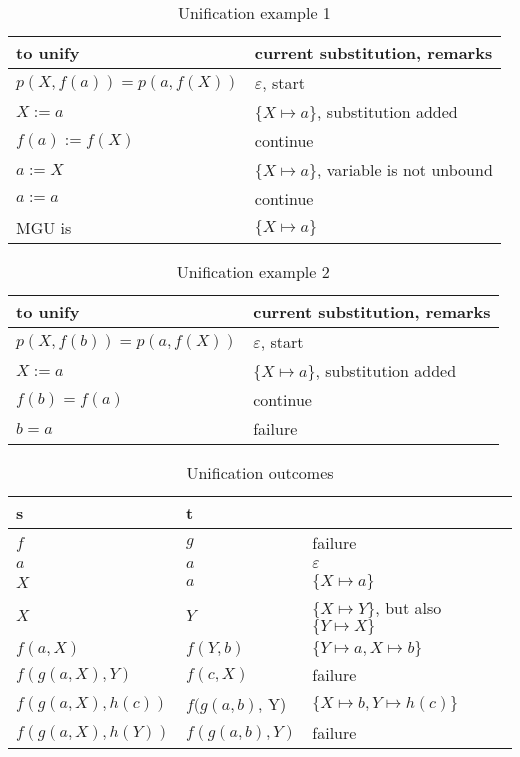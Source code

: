 \documentclass{article}
\begin{document}
\begin{table}[ht!]
    \centering
    \begin{tabular}{l|l}
        to unify & current substitution, remarks \\ 
        \hline
        $p(X, f(a))=p(a, f(X))$ & $\varepsilon$, start \\
        $X := a$ & $\{X \mapsto a\}$, substitution added \\
        $f(a) := f(X)$ & continue \\
        $a := X$ & $\{X \mapsto a\}$, variable is not unbound \\
        $a := a$ & continue \\
        MGU is & $\{X \mapsto a\}$ \\
    \end{tabular}
    \caption{Unification example 1}
\end{table}

\begin{table}[ht!]
    \centering
    \begin{tabular}{l|l}
        to unify & current substitution, remarks \\ 
        \hline
        $p(X, f(b)) = p(a, f(X))$ & $\varepsilon$, start \\
        $X := a$ & $\{X \mapsto a\}$, substitution added \\
        $f(b) = f(a)$ & continue \\
        $b = a$ & failure \\
    \end{tabular}
    \caption{Unification example 2}
\end{table}

\begin{table}[ht!]
    \centering
    \begin{tabular}{l|l|l}
        s & t & \\ 
        \hline
        $f$ & $g$ & failure \\
        $a$ & $a$ & $\varepsilon$ \\
        $X$ & $a$ & $\{X \mapsto a\}$ \\
        $X$ & $Y$ & $\{X \mapsto Y\}$, but also $\{Y \mapsto X\}$ \\
        $f(a, X)$ & $f(Y, b)$ & $\{Y \mapsto a, X \mapsto b\}$ \\
        $f(g(a, X), Y)$ & $f(c, X)$ & failure \\
        $f(g(a, X), h(c))$ & $f(g(a, b)$, Y) & $\{X \mapsto b, Y \mapsto h(c)\}$ \\
        $f(g(a, X), h(Y))$ & $f(g(a, b), Y)$ & failure \\
    \end{tabular}
    \caption{Unification outcomes}
\end{table}
\end{document}
